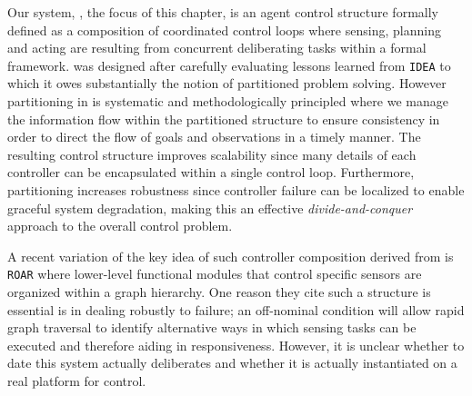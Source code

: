Our system, \rx, the focus of this chapter, is an agent control
structure formally defined as a composition of coordinated control
loops where sensing, planning and acting are resulting from concurrent
deliberating tasks within a formal framework.  \rx was designed after
carefully evaluating lessons learned from \texttt{IDEA} to which it
owes substantially the notion of partitioned problem solving. However
partitioning in \rx is systematic and methodologically principled
where we manage the information flow within the partitioned structure
to ensure consistency in order to direct the flow of goals and
observations in a timely manner. The resulting control structure
improves scalability since many details of each controller can be
encapsulated within a single control loop.  Furthermore, partitioning
increases robustness since controller failure can be localized to
enable graceful system degradation, making this an effective
\emph{divide-and-conquer} approach to the overall control problem.

A recent variation of the key idea of such controller composition
derived from \rx is \texttt{ROAR} \cite{degroote11} where lower-level
functional modules that control specific sensors are organized within
a graph hierarchy. One reason they cite such a structure is essential
is in dealing robustly to failure; an off-nominal condition will allow
rapid graph traversal to identify alternative ways in which sensing
tasks can be executed and therefore aiding in responsiveness. However,
it is unclear whether to date this system actually deliberates and
whether it is actually instantiated on a real platform for control.


